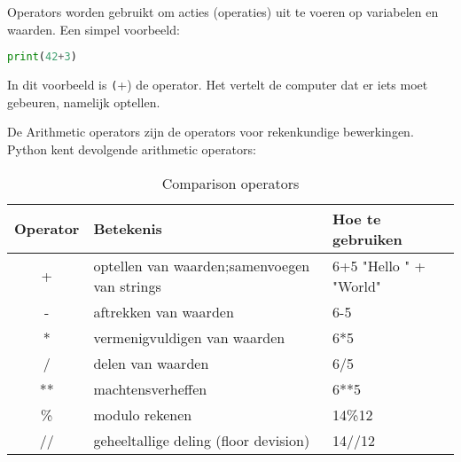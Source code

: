 Operators worden gebruikt om acties (operaties) uit te voeren op variabelen en waarden. Een simpel voorbeeld:
\begin{lstlisting}[language=python]
print(42+3)
\end{lstlisting}
In dit voorbeeld is \texttt(+) de operator. Het vertelt de computer dat er iets moet gebeuren, namelijk optellen.

De Arithmetic operators zijn de operators voor rekenkundige bewerkingen. Python kent devolgende arithmetic operators:
\begin{flushleft}
\begin{table}[h!]
\centering
	\begin{tabularx}{\textwidth}{ |c|X|X| }
\hline
	Operator &
	Betekenis &
	Hoe te gebruiken \\
\hline
	+\index{operator!+} &
	optellen\index{optellen} van waarden;\newline samenvoegen van strings &
		6+5 \newline
	"Hello " + "World" \\
\hline
	-\index{operator!-} &
	aftrekken\index{aftrekken} van waarden &
	6-5 	\\
\hline
	*\index{operator!*} &
	vermenigvuldigen\index{vermenigvuldigen} van waarden &
	6*5 \\
\hline
	/\index{operator!/} &
	delen\index{delen} van waarden &
	6/5 \\
\hline
	**\index{operator!**} &
	machtensverheffen\index{machtsverheffen} &
	6**5 \\
\hline
	\%\index{operator!\%} &
	modulo rekenen\index{modulo rekenen} &
	14\%12 \\
\hline
	//\index{operator!//} &
		geheeltallige deling\index{geheeltallige deling} (floor devision\index{floor devision}) &
	14//12 \\
\hline
\end{tabularx}
\caption{Comparison operators}
\label{table:compop}
\end{table}
\end{flushleft}

